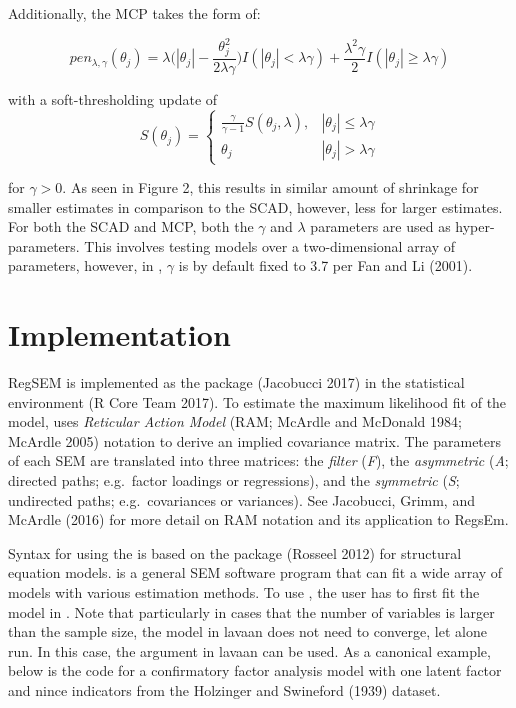 \documentclass[article]{jss}
\begin{document}
Additionally, the MCP takes the form of:

\[
pen_{\lambda,\gamma}(\theta_{j}) = \lambda\bigg(|\theta_{j}|-\frac{\theta_{j}^{2}}{2\lambda\gamma}\bigg)I(|\theta_{j}|<\lambda\gamma) +\frac{\lambda^{2}\gamma}{2}I(|\theta_{j}|\geq \lambda\gamma)
\]

with a soft-thresholding update of \[
S(\theta_{j})= 
\begin{cases}
\frac{\gamma}{\gamma-1}S(\theta_{j},\lambda),&  |\theta_{j}| \leq \lambda\gamma\\
\theta_{j} & |\theta_{j}| > \lambda \gamma
\end{cases}
\]

for \(\gamma > 0\). As seen in Figure 2, this results in similar amount
of shrinkage for smaller estimates in comparison to the SCAD, however,
less for larger estimates. For both the SCAD and MCP, both the
\(\gamma\) and \(\lambda\) parameters are used as hyper-parameters. This
involves testing models over a two-dimensional array of parameters,
however, in , \(\gamma\) is by default fixed to 3.7 per Fan
and Li (2001).

\section{Implementation}\label{implementation}

RegSEM is implemented as the  package (Jacobucci 2017) in
the  statistical environment (R Core Team 2017). To estimate
the maximum likelihood fit of the model,  uses
\textit{Reticular Action Model} (RAM; McArdle and McDonald 1984; McArdle
2005) notation to derive an implied covariance matrix. The parameters of
each SEM are translated into three matrices: the \textit{filter}
(\textit{F}), the \textit{asymmetric} (\textit{A}; directed paths;
e.g.~factor loadings or regressions), and the \textit{symmetric}
(\textit{S}; undirected paths; e.g.~covariances or variances). See
Jacobucci, Grimm, and McArdle (2016) for more detail on RAM notation and
its application to RegsEm.

Syntax for using the  is based on the  package
(Rosseel 2012) for structural equation models.  is a general
SEM software program that can fit a wide array of models with various
estimation methods. To use , the user has to first fit the
model in . Note that particularly in cases that the number
of variables is larger than the sample size, the model in lavaan does
not need to converge, let alone run. In this case, the
 argument in lavaan can be used. As a canonical
example, below is the code for a confirmatory factor analysis model with
one latent factor and nince indicators from the Holzinger and Swineford
(1939) dataset.
\end{document}
